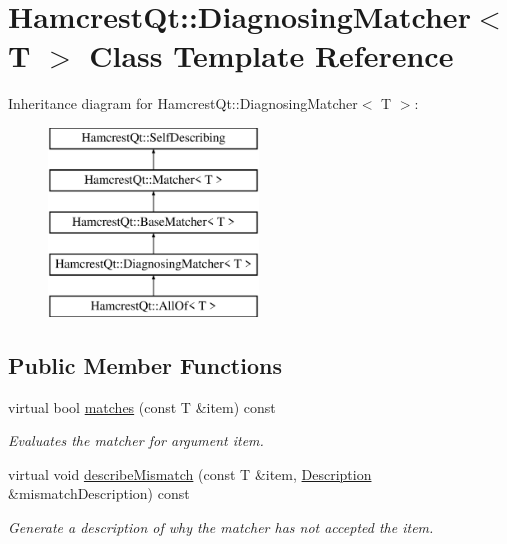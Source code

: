 \hypertarget{class_hamcrest_qt_1_1_diagnosing_matcher}{\section{Hamcrest\-Qt\-:\-:Diagnosing\-Matcher$<$ T $>$ Class Template Reference}
\label{class_hamcrest_qt_1_1_diagnosing_matcher}
}
Inheritance diagram for Hamcrest\-Qt\-:\-:Diagnosing\-Matcher$<$ T $>$\-:\begin{figure}[H]
\begin{center}
\leavevmode
\includegraphics[height=5.000000cm]{class_hamcrest_qt_1_1_diagnosing_matcher}
\end{center}
\end{figure}
\subsection*{Public Member Functions}
\begin{DoxyCompactItemize}
\item 
virtual bool \hyperlink{class_hamcrest_qt_1_1_diagnosing_matcher_a95ea76988bacda59586ec1423c4d0e6c}{matches} (const T \&item) const 
\begin{DoxyCompactList}\small\item\em Evaluates the matcher for argument {\itshape item}. \end{DoxyCompactList}\item 
virtual void \hyperlink{class_hamcrest_qt_1_1_diagnosing_matcher_a122cccc22b8be886b3202e0a126995ed}{describe\-Mismatch} (const T \&item, \hyperlink{class_hamcrest_qt_1_1_description}{Description} \&mismatch\-Description) const 
\begin{DoxyCompactList}\small\item\em Generate a description of why the matcher has not accepted the item. \end{DoxyCompactList}\end{DoxyCompactItemize}
